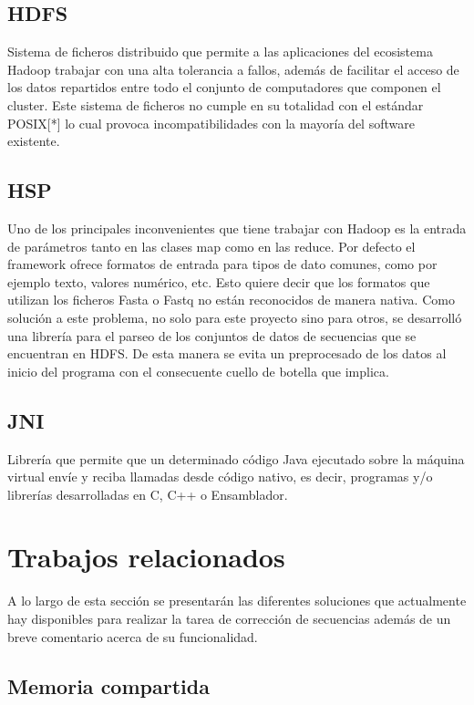 \documentclass[conference]{IEEEtran}
\begin{document}
\subsection{HDFS\cite{hadoop_hdfs}}
Sistema de ficheros distribuido que permite a las aplicaciones del ecosistema Hadoop trabajar con una alta tolerancia a fallos, además de facilitar el acceso de los datos repartidos entre todo el conjunto de computadores que componen el cluster. Este sistema de ficheros no cumple en su totalidad con el estándar POSIX[*] lo cual provoca incompatibilidades con la mayoría del software existente.

\subsection{HSP\cite{hsp}}
Uno de los principales inconvenientes que tiene trabajar con Hadoop es la entrada de parámetros tanto en las clases map como en las reduce. Por defecto el framework ofrece formatos de entrada para tipos de dato comunes, como por ejemplo texto, valores numérico, etc. Esto quiere decir que los formatos que utilizan los ficheros Fasta o Fastq\cite{fastq} no están reconocidos de manera nativa. Como solución a este problema, no solo para este proyecto sino para otros, se desarrolló una librería para el parseo de los conjuntos de datos de secuencias que se encuentran en HDFS. De esta manera se evita un preprocesado de los datos al inicio del programa con el consecuente cuello de botella que implica.

\subsection{JNI\cite{jni}}
Librería que permite que un determinado código Java ejecutado sobre la máquina virtual envíe y reciba llamadas desde código nativo, es decir, programas y/o librerías desarrolladas en C, C++ o Ensamblador.

\section{Trabajos relacionados}

A lo largo de esta sección se presentarán las diferentes soluciones que actualmente hay disponibles para realizar la tarea de corrección de secuencias además de un breve comentario acerca de su funcionalidad.

\subsection{Memoria compartida}
\end{document}
